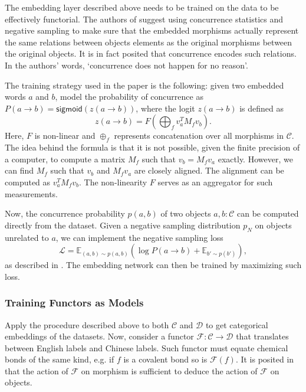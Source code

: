 \documentclass[12pt,a4paper,openright,twoside]{report}
\theoremstyle{plain}
\theoremstyle{definition}
\begin{document}
The embedding layer described above needs to be trained on the data to be effectively functorial. The authors of \cite{sheshmani2021categorical} suggest using concurrence statistics and negative sampling to make sure that the embedded morphisms actually represent the same relations between objects elements as the original morphisms between the original objects. It is in fact posited that concurrence encodes such relations. In the authors' words, \lq  concurrence does not happen for no reason\rq.


The training strategy used in the paper is the following: given two embedded words $a$ and $b$, model the probability of concurrence as $P(a \to b) = \mathsf{sigmoid}(z(a \to b))$, where the logit $z(a \to b)$ is defined as
\[z(a \to b) = F\left(\bigoplus_f v_a^TM_fv_b \right).\]
Here, $F$ is non-linear and $\oplus_f$ represents concatenation over all morphisms in $\mathcal{C}$. The idea behind the formula is that it is not possible, given the finite precision of a computer, to compute a matrix $M_f$ such that $v_b = M_fv_a$ exactly. However, we can find $M_f$ such that $v_b$ and $M_fv_a$ are closely aligned. The alignment can be computed as $v_a^TM_fv_b$. The non-linearity $F$ serves as an aggregator for such measurements.


Now, the concurrence probability $p(a,b)$ of two objects $a,b : \mathcal{C}$ can be computed directly from the dataset. Given a negative sampling distribution $p_N$ on objects unrelated to $a$, we can implement the negative sampling loss
\[\mathcal{L} = \mathbb{E}_{(a,b) \sim p(a,b)}\left(\log P(a \to b) + \mathbb{E}_{b' \sim p(b')}\right),\]
as described in \cite{sheshmani2021categorical}. The embedding network can then be trained by maximizing such loss.


\subsubsection{Training Functors as Models}

Apply the procedure described above to both $\mathcal{C}$ and $\mathcal{D}$ to get categorical embeddings of the datasets. Now, consider a functor $\mathcal{F}: \mathcal{C} \to \mathcal{D}$ that translates between English labels and Chinese labels. Such functor must equate chemical bonds of the same kind, e.g. if $f$ is a covalent bond so is $\mathcal{F}(f)$. It is posited in \cite{sheshmani2021categorical} that the action of $\mathcal{F}$ on morphism is sufficient to deduce the action of $\mathcal{F}$ on objects.
\end{document}
